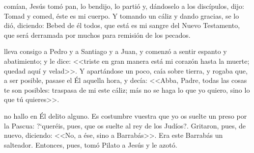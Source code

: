 \documentclass[10pt,twoside]{book}
\begin{document}
\noindent{}
comían, Jesús tomó pan, lo bendijo, lo partió y, dándoselo a los discípulos, dijo: Tomad y comed, éste es mi cuerpo. 
Y tomando un cáliz y dando gracias, se lo dió, diciendo: Bebed de él todos, que está es mi sangre del Nuevo Testamento, que será derramada por muchos 
para remisión de los pecados.

\vspace{2mm}

{} 

\vspace{2mm}

\iralfinal

\vspace{5mm}

\noindent{}

\vspace{4mm}

\space lleva consigo a Pedro y a Santiago y a Juan, y comenzó a sentir espanto y abatimiento; y le dice: <<triste en gran manera está mi corazón hasta la muerte;
quedad aquí y velad>>. Y apartándose un poco, caía sobre tierra, y rogaba que, a ser posible, pasase el Él aquella hora, y decía: <<Abba, Padre, todas las cosas te son posibles:
traspasa de mi este cáliz; más no se haga lo que yo quiero, sino lo que tú quieres>>.

\vspace{2mm}


\vspace{5mm}

\noindent{}
no hallo en Él delito alguno. Es costumbre vuestra que yo os suelte un preso por la Pascua: {?`}queréis, 
pues, que os suelte al rey de los Judíos?\guillemotright. Gritaron, pues, de nuevo, diciendo: <<No, a ése, sino a Barrabás>>. 
Era este Barrabás un salteador. Entonces, pues, tomó Pilato a Jesús y le azotó.
\end{document}

